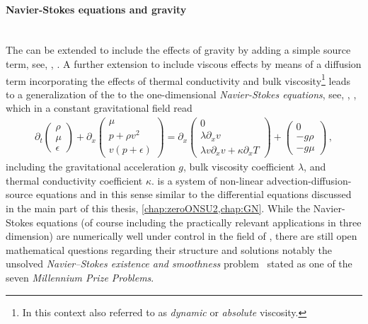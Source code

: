 \paragraph{Navier-Stokes equations and gravity}\label{paragraph:NSg}\mbox{} \\
The \eulereqs{} can be extended to include the effects of gravity by adding a simple source term, see, \eg{}, .
A further extension to include viscous effects by means of a diffusion term incorporating the effects of thermal conductivity and bulk viscosity\footnote{%
	In this context also referred to as \textit{dynamic} or \textit{absolute} viscosity.%
} leads to a generalization of the \eulereqs{} to the one-dimensional \textit{Navier-Stokes equations}, see, \eg{}, , which in a constant gravitational field read
\begin{align}
\partial_t\begin{pmatrix}
	\rho\\
	\mu\\
	\epsilon
\end{pmatrix}
+\partial_x
\begin{pmatrix}
 \mu  \\
 p+\rho  v^2 \\
 v (p+\epsilon )
\end{pmatrix}
=\partial_x \begin{pmatrix}
 0  \\
 \lambda \partial_x v\\
 \lambda v\partial_x v+\kappa\partial_x T
\end{pmatrix}+\begin{pmatrix}
 0  \\
 -g \rho\\
 -g \mu
\end{pmatrix}\, ,\label{eq:navierStokes}
\end{align}
including the gravitational acceleration $g$, bulk viscosity coefficient $\lambda$, and thermal conductivity coefficient $\kappa$.
 is a system of non-linear advection-diffusion-source equations and in this sense similar to the differential equations discussed in the main part of this thesis, \cf{} \cref{chap:zeroONSU2,chap:GN}.
While the Navier-Stokes equations (of course including the practically relevant applications in three dimension) are numerically well under control in the field of \cfd{}, there are still open mathematical questions regarding their structure and solutions \dash{} notably the unsolved \textit{Navier–Stokes existence and smoothness} problem~\cite{NavierStokesMilleniumProblem} stated as one of the seven \textit{Millennium Prize Problems}.
